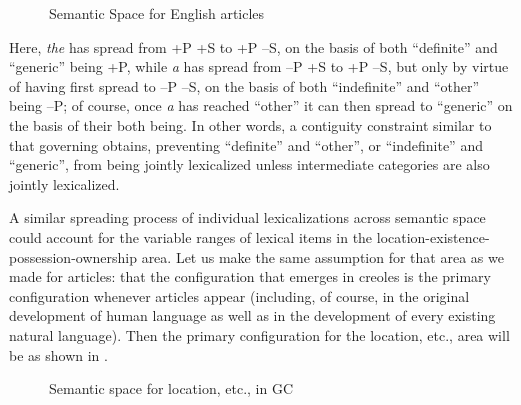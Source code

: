 \begin{figure}
\begin{center}
\begin{tikzpicture}[baseline]
		\end{tikzpicture}
	\end{center}
	\caption{Semantic Space for English articles}\label{fig:4.4}
\end{figure}

\noindent Here, \textit{the} has spread from +P +S to +P --S, on the basis of both ``defi\-nite'' and ``generic'' being +P, while \textit{a} has spread from --P +S to +P --S, but only by virtue of having first spread to --P --S, on the basis of both ``indefinite'' and ``other'' being --P; of course, once \textit{a} has reached ``other'' it can then spread to ``generic'' on the basis of their both being. In other words, a contiguity constraint similar to that governing  obtains, preventing ``definite'' and ``other'', or ``indefinite'' and ``generic'', from being jointly lexicalized unless intermediate categories are also jointly lexicalized.

A similar spreading process of individual lexicalizations across semantic space could account for the variable ranges of lexical items
in the location-existence-possession-ownership area. Let us make the same assumption for that area as we made for articles: that the configuration that emerges in creoles is the primary configuration whenever articles appear (including, of course, in the original development of human language as well as in the development of every existing natural language). Then the primary configuration for the location, etc., area will be as shown in . %

\begin{figure}[h]
	\begin{center}
	\end{center}
	\caption{Semantic space for location, etc., in GC}\label{fig:4.5}
\end{figure}

